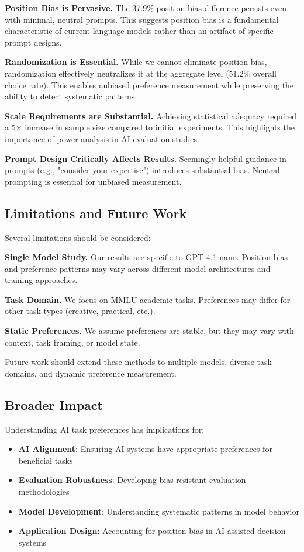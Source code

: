 \documentclass[11pt,a4paper]{article}
\begin{document}
\textbf{Position Bias is Pervasive.} The 37.9\% position bias difference persists even with minimal, neutral prompts. This suggests position bias is a fundamental characteristic of current language models rather than an artifact of specific prompt designs.

\textbf{Randomization is Essential.} While we cannot eliminate position bias, randomization effectively neutralizes it at the aggregate level (51.2\% overall choice rate). This enables unbiased preference measurement while preserving the ability to detect systematic patterns.

\textbf{Scale Requirements are Substantial.} Achieving statistical adequacy required a 5× increase in sample size compared to initial experiments. This highlights the importance of power analysis in AI evaluation studies.

\textbf{Prompt Design Critically Affects Results.} Seemingly helpful guidance in prompts (e.g., "consider your expertise") introduces substantial bias. Neutral prompting is essential for unbiased measurement.

\subsection{Limitations and Future Work}

Several limitations should be considered:

\textbf{Single Model Study.} Our results are specific to GPT-4.1-nano. Position bias and preference patterns may vary across different model architectures and training approaches.

\textbf{Task Domain.} We focus on MMLU academic tasks. Preferences may differ for other task types (creative, practical, etc.).

\textbf{Static Preferences.} We assume preferences are stable, but they may vary with context, task framing, or model state.

Future work should extend these methods to multiple models, diverse task domains, and dynamic preference measurement.

\subsection{Broader Impact}

Understanding AI task preferences has implications for:
\begin{itemize}
    \item \textbf{AI Alignment}: Ensuring AI systems have appropriate preferences for beneficial tasks
    \item \textbf{Evaluation Robustness}: Developing bias-resistant evaluation methodologies
    \item \textbf{Model Development}: Understanding systematic patterns in model behavior
    \item \textbf{Application Design}: Accounting for position bias in AI-assisted decision systems
\end{itemize}
\end{document}
